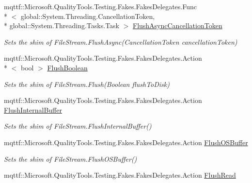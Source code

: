 \begin{DoxyCompactItemize}
mqttf\-::\-Microsoft.\-Quality\-Tools.\-Testing.\-Fakes.\-Fakes\-Delegates.\-Func\\*
$<$ global\-::\-System.\-Threading.\-Cancellation\-Token, \\*
global\-::\-System.\-Threading.\-Tasks.\-Task $>$ \hyperlink{class_system_1_1_i_o_1_1_fakes_1_1_shim_file_stream_a422d3301399ea9596e07de8d1592d61a}{Flush\-Async\-Cancellation\-Token}
\begin{DoxyCompactList}\small\item\em Sets the shim of File\-Stream.\-Flush\-Async(\-Cancellation\-Token cancellation\-Token)\end{DoxyCompactList}\item 
mqttf\-::\-Microsoft.\-Quality\-Tools.\-Testing.\-Fakes.\-Fakes\-Delegates.\-Action\\*
$<$ bool $>$ \hyperlink{class_system_1_1_i_o_1_1_fakes_1_1_shim_file_stream_ac5a08e313ae16e55fdb7e9b97a02e477}{Flush\-Boolean}
\begin{DoxyCompactList}\small\item\em Sets the shim of File\-Stream.\-Flush(\-Boolean flush\-To\-Disk)\end{DoxyCompactList}\item 
mqttf\-::\-Microsoft.\-Quality\-Tools.\-Testing.\-Fakes.\-Fakes\-Delegates.\-Action \hyperlink{class_system_1_1_i_o_1_1_fakes_1_1_shim_file_stream_ac0514df5d13a1f6b52bdcf05e276f611}{Flush\-Internal\-Buffer}
\begin{DoxyCompactList}\small\item\em Sets the shim of File\-Stream.\-Flush\-Internal\-Buffer()\end{DoxyCompactList}\item 
mqttf\-::\-Microsoft.\-Quality\-Tools.\-Testing.\-Fakes.\-Fakes\-Delegates.\-Action \hyperlink{class_system_1_1_i_o_1_1_fakes_1_1_shim_file_stream_a27b3a7c67d4410d815c956183b940d66}{Flush\-O\-S\-Buffer}
\begin{DoxyCompactList}\small\item\em Sets the shim of File\-Stream.\-Flush\-O\-S\-Buffer()\end{DoxyCompactList}\item 
mqttf\-::\-Microsoft.\-Quality\-Tools.\-Testing.\-Fakes.\-Fakes\-Delegates.\-Action \hyperlink{class_system_1_1_i_o_1_1_fakes_1_1_shim_file_stream_a7be19a1e8bf32e8aa4ba043574138a21}{Flush\-Read}

\end{DoxyCompactItemize}
